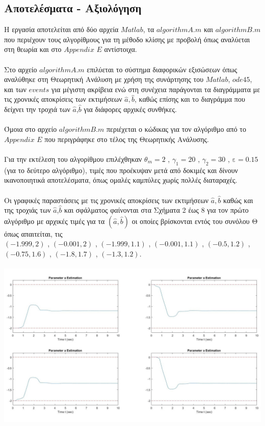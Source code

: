 \documentclass[12pt]{article}
\begin{document}
\subsection{Αποτελέσματα - Αξιολόγηση}
Η εργασία αποτελείται από δύο αρχεία $Matlab$, τα $algorithmA.m$ και $algorithmB.m$ που περιέχουν τους αλγορίθμους για τη μέθοδο κλίσης με προβολή όπως αναλύεται στη θεωρία και στο $Appendix$ $E$ αντίστοιχα.
\\ \\
Στο αρχείο $algorithmA.m$ επιλύεται το σύστημα διαφορικών εξισώσεων όπως αναλύθηκε στη Θεωρητική Ανάλυση με χρήση της συνάρτησης του $Matlab$, $ode45$, και των $events$ για μέγιστη ακρίβεια ενώ στη συνέχεια παράγονται τα διαγράμματα με τις χρονικές αποκρίσεις των εκτιμήσεων $\hat{a},\hat{b}$, καθώς επίσης και το διαγράμμα που δείχνει την τροχιά των $\hat{a}$,$\hat{b}$ για διάφορες αρχικές συνθήκες.
\\ \\
Όμοια στο αρχείο $algorithmB.m$ περιέχεται ο κώδικας για τον αλγόριθμο από το $Appendix$ $E$ που περιγράφηκε στο τέλος της Θεωρητικής Ανάλυσης.
\\ \\
Για την εκτέλεση του αλγορίθμου επιλέχθηκαν $\theta_m=2$ , $\gamma_1=20$ , $\gamma_2=30$ , $\text{ε}=0.15$ (για το δεύτερο αλγόριθμο), τιμές που προέκυψαν μετά από δοκιμές και δίνουν ικανοποιητικά αποτελέσματα, όπως ομαλές καμπύλες χωρίς πολλές διαταραχές.
\\ \\
Οι γραφικές παραστάσεις με τις χρονικές αποκρίσεις των εκτιμήσεων $\hat{a},\hat{b}$ καθώς και της τροχιάς των $\hat{a}$,$\hat{b}$ και σφάλματος φαίνονται στα Σχήματα 2 έως 8 για τον πρώτο αλγόριθμο με αρχικές τιμές για τα $(\hat{a},\hat{b})$ οι οποίες βρίσκονται εντός του συνόλου Θ όπως απαιτείται, τις
\\
 $(-1.999,2)$ , $(-0.001,2)$ , $(-1.999,1.1)$ , $(-0.001,1.1)$ , $(-0.5,1.2)$ , $(-0.75,1.6)$ , $(-1.8,1.7)$ , $(-1.3,1.2)$.
\\ \\
\includegraphics[width=\linewidth]{a_est_a1.jpg}
\end{document}
